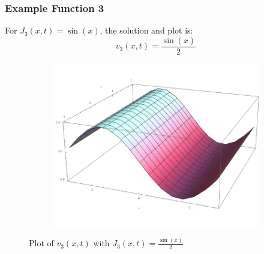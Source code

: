 \documentclass[12pt]{article}
\begin{document}
\pagebreak
\subsubsection{Example Function 3}
For $J_{3}(x,t) = \sin(x)$, the solution and plot is:
$$ v_3(x,t) = \frac{\sin(x)}{2} $$

\begin{figure}[H]
	\centering
	\begin{subfigure}[h]{0.8\textwidth}
        \includegraphics[width=\textwidth]{Part1Plots/plot3}
    \end{subfigure}
    \caption{Plot of $v_{3}(x,t)$ with $ J_3(x,t) = \frac{\sin(x)}{2} $ } \label{fig:jext3}
\end{figure}

\pagebreak
\end{document}
